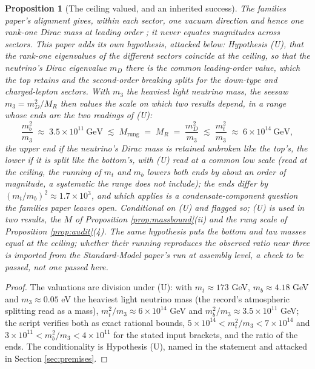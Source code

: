 \documentclass[11pt]{article}
\newtheorem{proposition}[theorem]{Proposition}
\theoremstyle{definition}
\begin{document}
\begin{proposition}[The ceiling valued, and an inherited success]\label{prop:ceiling}
The families paper's alignment gives, within each sector, one vacuum direction and hence one rank-one Dirac mass at leading order \cite[Prop.~4.3]{ButlerT13}; it never equates magnitudes across sectors. This paper adds its own hypothesis, attacked below: \emph{Hypothesis (U)}, that the rank-one eigenvalues of the different sectors coincide at the ceiling, so that the neutrino's Dirac eigenvalue $m_{D}$ there is the common leading-order value, which the top retains and the second-order breaking splits for the down-type and charged-lepton sectors. With $m_{3}$ the heaviest light neutrino mass, the seesaw $m_{3} = m_{D}^{2}/M_{R}$ then values the scale on which two results depend, in a range whose ends are the two readings of (U):
\[
\frac{m_{b}^{2}}{m_{3}} \;\approx\; 3.5 \times 10^{11}\ \mathrm{GeV} \;\lesssim\; M_{\mathrm{rung}} \;=\; M_{R} \;=\; \frac{m_{D}^{2}}{m_{3}} \;\lesssim\; \frac{m_{t}^{2}}{m_{3}} \;\approx\; 6 \times 10^{14}\ \mathrm{GeV},
\]
the upper end if the neutrino's Dirac mass is retained unbroken like the top's, the lower if it is split like the bottom's, with (U) read at a common low scale (read at the ceiling, the running of $m_{t}$ and $m_{b}$ lowers both ends by about an order of magnitude, a systematic the range does not include); the ends differ by $(m_{t}/m_{b})^{2} \approx 1.7 \times 10^{3}$, and which applies is a condensate-component question the families paper leaves open. Conditional on (U) and flagged so; (U) is used in two results, the $M$ of Proposition \ref{prop:massbound}(ii) and the rung scale of Proposition \ref{prop:audit}(4). The same hypothesis puts the bottom and tau masses equal at the ceiling; whether their running reproduces the observed ratio near three is imported from the Standard-Model paper's run \cite{ButlerT12} at assembly level, a check to be passed, not one passed here.
\end{proposition}

\begin{proof}
The valuations are division under (U): with $m_{t} \approx 173$ GeV, $m_{b} \approx 4.18$ GeV and $m_{3} \approx 0.05$ eV the heaviest light neutrino mass (the record's atmospheric splitting read as a mass), $m_{t}^{2}/m_{3} \approx 6 \times 10^{14}$ GeV and $m_{b}^{2}/m_{3} \approx 3.5 \times 10^{11}$ GeV; the script verifies both as exact rational bounds, $5 \times 10^{14} < m_{t}^{2}/m_{3} < 7 \times 10^{14}$ and $3 \times 10^{11} < m_{b}^{2}/m_{3} < 4 \times 10^{11}$ for the stated input brackets, and the ratio of the ends. The conditionality is Hypothesis (U), named in the statement and attacked in Section \ref{sec:premises}.
\end{proof}
\end{document}
